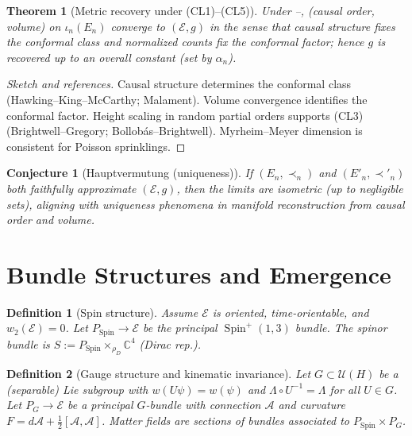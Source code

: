 \documentclass[12pt,a4paper]{article}
\newtheorem{definition}{Definition}
\newtheorem{theorem}{Theorem}
\newtheorem{conjecture}{Conjecture}
\newcommand{\C}{\mathbb{C}}
\DeclareMathOperator{\Spin}{Spin}
\begin{document}
\begin{theorem}[Metric recovery under \textnormal{(CL1)--(CL5)}]\label{thm:metric_recovery_cl}
Under --, (causal order, volume) on $\iota_n(E_n)$ converge to $(\mathcal E,g)$ in the sense that causal structure fixes the conformal class and normalized counts fix the conformal factor; hence $g$ is recovered up to an overall constant (set by $\alpha_n$).
\end{theorem}

\begin{proof}[Sketch and references]
Causal structure determines the conformal class (Hawking--King--McCarthy; Malament). Volume convergence identifies the conformal factor. Height scaling in random partial orders supports (CL3) (Brightwell--Gregory; Bollobás--Brightwell). Myrheim--Meyer dimension is consistent for Poisson sprinklings.
\end{proof}

\begin{conjecture}[Hauptvermutung (uniqueness)]
If $(E_n,\prec_n)$ and $(E'_n,\prec'_n)$ both faithfully approximate $(\mathcal E,g)$, then the limits are isometric (up to negligible sets), aligning with uniqueness phenomena in manifold reconstruction from causal order and volume.
\end{conjecture}

\section{Bundle Structures and Emergence}

\begin{definition}[Spin structure]
Assume $\mathcal{E}$ is oriented, time-orientable, and $w_2(\mathcal{E})=0$.
Let $P_{\Spin}\to\mathcal{E}$ be the principal $\Spin^+(1,3)$ bundle.
The spinor bundle is $S:=P_{\Spin}\times_{\rho_D}\C^4$ (Dirac rep.).
\end{definition}

\begin{definition}[Gauge structure and kinematic invariance]\label{def:gauge}
Let $G\subset \mathcal U(H)$ be a (separable) Lie subgroup with $w(U\psi)=w(\psi)$ and $\Lambda\circ U^{-1}=\Lambda$ for all $U\in G$.
Let $P_G\to\mathcal{E}$ be a principal $G$-bundle with connection $\mathcal{A}$ and curvature $F=d\mathcal{A}+\frac{1}{2}[\mathcal{A},\mathcal{A}]$.
Matter fields are sections of bundles associated to $P_{\Spin}\times P_G$.
\end{definition}
\end{document}
